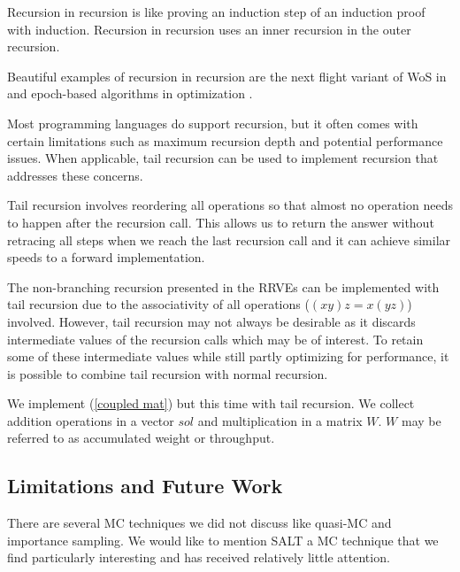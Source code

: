 \documentclass[a4paper,12pt]{article}
\begin{document}
\begin{technique}\label{tech:recu in recu}
    Recursion in recursion is like proving an induction
    step of an induction proof with induction. Recursion in recursion
    uses an inner recursion in the outer recursion.
\end{technique}

\begin{related}
    Beautiful examples of recursion in recursion are
    the next flight variant of WoS in
    \cite{sawhney_grid-free_2022} and epoch-based algorithms in optimization
    \cite{gupta_convergence_2021}.
\end{related}

Most programming languages do support recursion, but it often comes with certain
limitations such as maximum recursion depth and potential performance issues.
When applicable, tail recursion can be used to
implement recursion that addresses these concerns.

\begin{technique}
    Tail recursion involves reordering all operations
    so that almost no operation needs to happen after
    the recursion call. This allows us to return the
    answer without retracing all steps when we reach
    the last recursion call and it can achieve similar
    speeds to a forward implementation.
\end{technique}

The non-branching recursion presented in the RRVEs
can be implemented with tail recursion due to the associativity of
all operations ($(xy)z = x(yz)$) involved. However, tail recursion
may not always be desirable as it discards intermediate values of
the recursion calls which may be of interest. To retain some of these intermediate
values while still partly optimizing for performance, it is possible
to combine tail recursion with normal recursion.

\begin{pythonn}
    We implement (\ref{coupled mat}) but this time with tail recursion.
    We collect addition operations in a vector $sol$ and multiplication
    in a matrix $W$. $W$ may be referred to as accumulated weight or throughput.
    \vspace{0.3cm}
\end{pythonn}


\subsection{Limitations and Future Work}
There are several MC techniques we did not discuss like quasi-MC and importance sampling.
We would like to mention SALT  a MC technique that we find
particularly interesting and has received relatively little attention.
\end{document}
